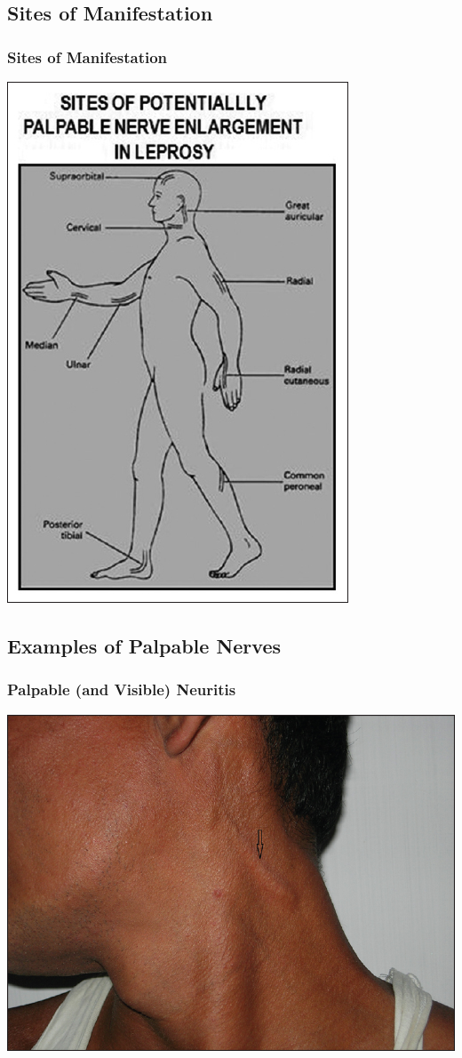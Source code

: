 \documentclass{beamer}
\begin{document}
\subsection{Sites of Manifestation}
	\begin{frame}
		\frametitle{Sites of Manifestation}
			\centering
			\includegraphics[height=0.90\textheight,keepaspectratio]{hansen-sites.jpg}
	\end{frame}

\subsection{Examples of Palpable Nerves}
	\begin{frame}
		\frametitle{Palpable (and Visible) Neuritis}
		\centering
		\includegraphics[height=0.8\textheight,keepaspectratio]{great-auricular.jpg}
	\end{frame}
\end{document}
